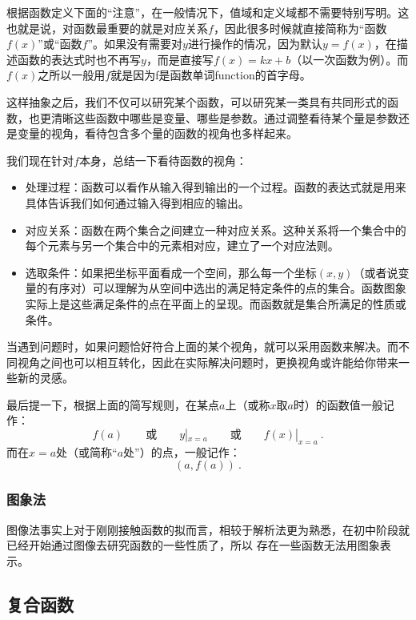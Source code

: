 根据函数定义下面的“注意”，在一般情况下，值域和定义域都不需要特别写明。这也就是说，对函数最重要的就是对应关系$f$，因此很多时候就直接简称为“函数$f(x)$”或“函数$f$”。如果没有需要对$y$进行操作的情况，因为默认$y=f(x)$，在描述函数的表达式时也不再写$y$，而是直接写$f(x)=kx+b$（以一次函数为例）。而$f(x)$之所以一般用$f$就是因为f是函数单词function的首字母。

这样抽象之后，我们不仅可以研究某个函数，可以研究某一类具有共同形式的函数，也更清晰这些函数中哪些是变量、哪些是参数。通过调整看待某个量是参数还是变量的视角，看待包含多个量的函数的视角也多样起来。

我们现在针对$f$本身，总结一下看待函数的视角：

\begin{itemize}
\item 处理过程：函数可以看作从输入得到输出的一个过程。函数的表达式就是用来具体告诉我们如何通过输入得到相应的输出。
\item 对应关系：函数在两个集合之间建立一种对应关系。这种关系将一个集合中的每个元素与另一个集合中的元素相对应，建立了一个对应法则。
\item 选取条件：如果把坐标平面看成一个空间，那么每一个坐标$(x,y)$（或者说变量的有序对）可以理解为从空间中选出的满足特定条件的点的集合。函数图象实际上是这些满足条件的点在平面上的呈现。而函数就是集合所满足的性质或条件。
\end{itemize}

当遇到问题时，如果问题恰好符合上面的某个视角，就可以采用函数来解决。而不同视角之间也可以相互转化，因此在实际解决问题时，更换视角或许能给你带来一些新的灵感。

最后提一下，根据上面的简写规则，在某点$a$上（或称$x$取$a$时）的函数值一般记作：
\begin{equation}
f(a)\qquad\text{或}\qquad y|_{x=a}\qquad\text{或}\qquad f(x)|_{x=a}~.
\end{equation}
而在$x=a$处（或简称“$a$处”）的点，一般记作：
\begin{equation}
(a,f(a))~.
\end{equation}

\subsubsection{图象法}

图像法事实上对于刚刚接触函数的拟而言，相较于解析法更为熟悉，在初中阶段就已经开始通过图像去研究函数的一些性质了，所以
存在一些函数无法用图象表示。



\subsection{复合函数}

